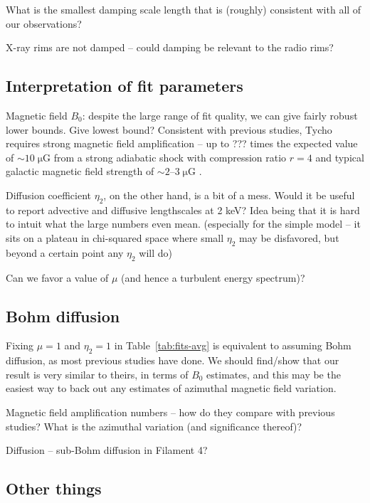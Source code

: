 \documentclass[iop, apj, numberedappendix, twocolappendix]{emulateapj}
\newcommand*{\mt}{\mathrm}
\newcommand*{\unit}[1]{\;\mt{#1}}  %
\newcommand*{\abt}{\mathord{\sim}} %
\begin{document}
What is the smallest damping scale length that is (roughly) consistent with all
of our observations?

X-ray rims are not damped -- could damping be relevant to the radio rims?

\subsection{Interpretation of fit parameters}

Magnetic field $B_0$: despite the large range of fit quality, we can give
fairly robust lower bounds.  Give lowest bound?  Consistent with previous
studies, Tycho requires strong magnetic field amplification -- up to ??? times
the expected value of $\abt 10 \unit{\mu G}$ from a strong adiabatic shock with
compression ratio $r=4$ and typical galactic magnetic field strength of $\abt
2$--$3 \unit{\mu G}$ \citep{lyne1989, han2006}.

Diffusion coefficient $\eta_2$, on the other hand, is a bit of a mess.
Would it be useful to report advective and diffusive lengthscales at 2 keV?
Idea being that it is hard to intuit what the large numbers even mean.
(especially for the simple model -- it sits on a plateau in chi-squared space
where small $\eta_2$ may be disfavored, but beyond a certain point any $\eta_2$
will do)

Can we favor a value of $\mu$ (and hence a turbulent energy spectrum)?

\subsection{Bohm diffusion}

Fixing $\mu = 1$ and $\eta_2 = 1$ in Table~\ref{tab:fits-avg} is equivalent to
assuming Bohm diffusion, as most previous studies have done.
We should find/show that our result is very similar to theirs, in terms of
$B_0$ estimates, and this may be the easiest way to back out any estimates of
azimuthal magnetic field variation.

Magnetic field amplification numbers -- how do they compare with previous
studies?  What is the azimuthal variation (and significance thereof)?

Diffusion -- sub-Bohm diffusion in Filament 4?

\subsection{Other things}
\end{document}
